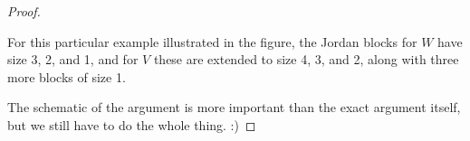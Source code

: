 \begin{proof}
\begin{itemize}
For this particular example illustrated in the figure, the Jordan blocks for $W$ have size 3, 2, and 1, and for $V$ these are extended to size 4, 3, and 2, along with three more blocks of size 1. 
\end{itemize}

The schematic of the argument is more important than the exact argument itself, but we still have to do the whole thing. :)

\end{proof}

\newpage